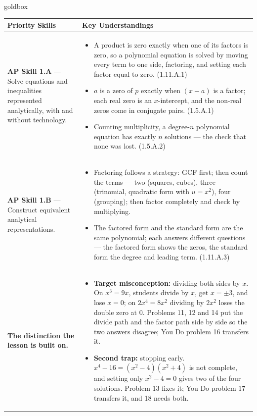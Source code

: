 \documentclass[10pt]{article}
\begin{document}
\renewcommand{\arraystretch}{1.6}
\begin{skillbox}{goldbox}
\begin{tabularx}{\linewidth}{@{}X X@{}}
\textbf{Priority Skills} &
\textbf{Key Understandings} \\
\midrule
\textbf{AP Skill 1.A} --- Solve equations and inequalities represented analytically, with
and without technology. &
\begin{itemize}[leftmargin=1.2em,itemsep=2pt,topsep=0pt]
  \item A product is zero exactly when one of its factors is zero, so a polynomial equation
        is solved by moving every term to one side, factoring, and setting each factor equal
        to zero. (1.11.A.1)
  \item $a$ is a zero of $p$ exactly when $(x - a)$ is a factor; each real zero is an
        $x$-intercept, and the non-real zeros come in conjugate pairs. (1.5.A.1)
  \item Counting multiplicity, a degree-$n$ polynomial equation has exactly $n$ solutions ---
        the check that none was lost. (1.5.A.2)
\end{itemize} \\
\textbf{AP Skill 1.B} --- Construct equivalent analytical representations. &
\begin{itemize}[leftmargin=1.2em,itemsep=2pt,topsep=0pt]
  \item Factoring follows a strategy: GCF first; then count the terms --- two (squares, cubes),
        three (trinomial, quadratic form with $u = x^2$), four (grouping); then factor
        completely and check by multiplying.
  \item The factored form and the standard form are the same polynomial; each answers
        different questions --- the factored form shows the zeros, the standard form the
        degree and leading term. (1.11.A.3)
\end{itemize} \\
\textbf{The distinction the lesson is built on.} &
\begin{itemize}[leftmargin=1.2em,itemsep=2pt,topsep=0pt]
  \item \textbf{Target misconception:} dividing both sides by $x$. On $x^3 = 9x$, students
        divide by $x$, get $x = \pm 3$, and lose $x = 0$; on $2x^4 = 8x^2$ dividing by $2x^2$
        loses the double zero at 0. Problems 11, 12 and 14 put the divide path and the factor
        path side by side so the two answers disagree; You Do problem 16 transfers it.
  \item \textbf{Second trap:} stopping early. $x^4 - 16 = (x^2 - 4)(x^2 + 4)$ is not complete,
        and setting only $x^2 - 4 = 0$ gives two of the four solutions. Problem 13 fixes it;
        You Do problem 17 transfers it, and 18 needs both.
\end{itemize} \\
\end{tabularx}
\end{skillbox}
\end{document}
